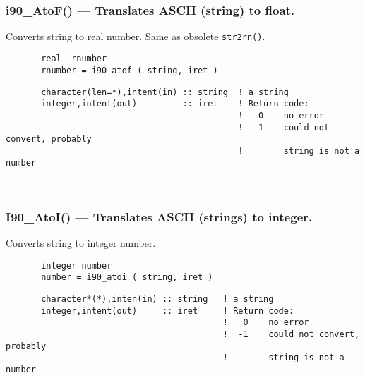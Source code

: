  
\mbox{}\hrulefill\ 
 
  \subsubsection{i90\_AtoF() --- Translates ASCII (string) to float. }

       Converts string to real number. Same as obsolete {\tt str2rn()}.
  
\begin{verbatim}       real  rnumber
       rnumber = i90_atof ( string, iret )\end{verbatim}
\begin{verbatim}
       character(len=*),intent(in) :: string  ! a string
       integer,intent(out)         :: iret    ! Return code:
                                              !   0    no error
                                              !  -1    could not convert, probably
                                              !        string is not a number
 \end{verbatim}%
 
 
\mbox{}\hrulefill\ 

  \subsubsection{I90\_AtoI() --- Translates ASCII (strings) to integer. }

       Converts string to integer number.
  
\begin{verbatim}       integer number
       number = i90_atoi ( string, iret )\end{verbatim}
\begin{verbatim}
       character*(*),inten(in) :: string   ! a string
       integer,intent(out)     :: iret     ! Return code:
                                           !   0    no error
                                           !  -1    could not convert, probably
                                           !        string is not a number
 \end{verbatim}%
 
